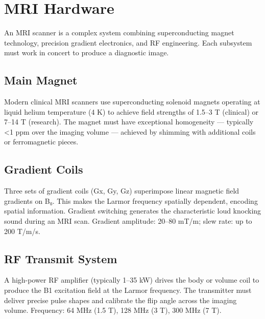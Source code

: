 \section{MRI Hardware}\label{sec:wiki_mri_hardware}



An MRI scanner is a complex system combining superconducting magnet technology, precision gradient electronics, and RF engineering. Each subsystem must work in concert to produce a diagnostic image.

				

\subsection{Main Magnet}

				

Modern clinical MRI scanners use superconducting solenoid magnets operating at liquid helium temperature (4 K) to achieve field strengths of 1.5–3 T (clinical) or 7–14 T (research). The magnet must have exceptional homogeneity — typically \textless{}1 ppm over the imaging volume — achieved by shimming with additional coils or ferromagnetic pieces.


				

\subsection{Gradient Coils}

				

Three sets of gradient coils (Gx, Gy, Gz) superimpose linear magnetic field gradients on B₀. This makes the Larmor frequency spatially dependent, encoding spatial information. Gradient switching generates the characteristic loud knocking sound during an MRI scan. Gradient amplitude: 20–80 mT/m; slew rate: up to 200 T/m/s.

				

\subsection{RF Transmit System}

				

A high-power RF amplifier (typically 1–35 kW) drives the body or volume coil to produce the B1 excitation field at the Larmor frequency. The transmitter must deliver precise pulse shapes and calibrate the flip angle across the imaging volume. Frequency: 64 MHz (1.5 T), 128 MHz (3 T), 300 MHz (7 T).


